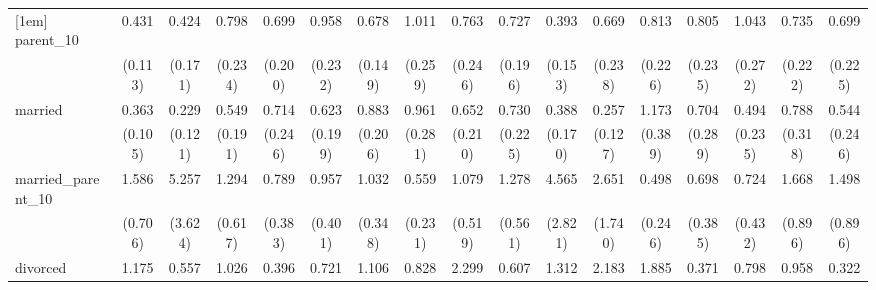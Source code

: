 {\begin{tabular}{l*{16}{c}}
[1em]
parent\_10           &       0.431\sym{**} &       0.424\sym{*}  &       0.798         &       0.699         &       0.958         &       0.678         &       1.011         &       0.763         &       0.727         &       0.393\sym{*}  &       0.669         &       0.813         &       0.805         &       1.043         &       0.735         &       0.699         \\
                    &     (0.113)         &     (0.171)         &     (0.234)         &     (0.200)         &     (0.232)         &     (0.149)         &     (0.259)         &     (0.246)         &     (0.196)         &     (0.153)         &     (0.238)         &     (0.226)         &     (0.235)         &     (0.272)         &     (0.222)         &     (0.225)         \\
[1em]
married             &       0.363\sym{***}&       0.229\sym{**} &       0.549         &       0.714         &       0.623         &       0.883         &       0.961         &       0.652         &       0.730         &       0.388\sym{*}  &       0.257\sym{**} &       1.173         &       0.704         &       0.494         &       0.788         &       0.544         \\
                    &     (0.105)         &     (0.121)         &     (0.191)         &     (0.246)         &     (0.199)         &     (0.206)         &     (0.281)         &     (0.210)         &     (0.225)         &     (0.170)         &     (0.127)         &     (0.389)         &     (0.289)         &     (0.235)         &     (0.318)         &     (0.246)         \\
[1em]
married\_parent\_10   &       1.586         &       5.257\sym{*}  &       1.294         &       0.789         &       0.957         &       1.032         &       0.559         &       1.079         &       1.278         &       4.565\sym{*}  &       2.651         &       0.498         &       0.698         &       0.724         &       1.668         &       1.498         \\
                    &     (0.706)         &     (3.624)         &     (0.617)         &     (0.383)         &     (0.401)         &     (0.348)         &     (0.231)         &     (0.519)         &     (0.561)         &     (2.821)         &     (1.740)         &     (0.246)         &     (0.385)         &     (0.432)         &     (0.896)         &     (0.896)         \\
[1em]
divorced            &       1.175         &       0.557         &       1.026         &       0.396         &       0.721         &       1.106         &       0.828         &       2.299\sym{*}  &       0.607         &       1.312         &       2.183         &       1.885         &       0.371         &       0.798         &       0.958         &       0.322         \\

\end{tabular}}
